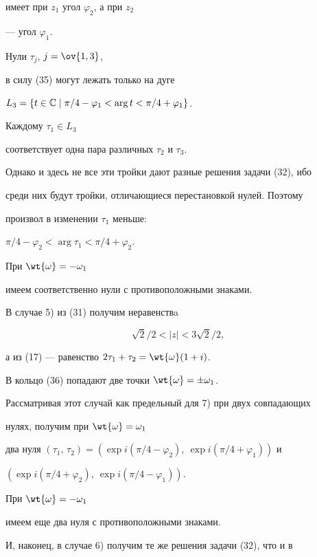 имеет при $z_1$ угол $\varphi _2$, а при $z_2$


--- угол $\varphi _1$.


Нули $\tau_{j}$, $j=\ov{1,3}$,


в силу (35) могут лежать только на дуге


$L_3=\{t\in\Bbb C\mid \pi /4-\varphi_1<\arg t<\pi/4+\varphi _1\}$.


Каждому $\tau_1 \in L_3 $


соответствует одна пара различных $\tau_2$ и $\tau_3$.


Однако и здесь не все эти тройки дают разные решения задачи (32), ибо


среди них будут тройки, отличающиеся перестановкой нулей. Поэтому


произвол в изменении $\tau_1$ меньше:


$\pi /4 -\varphi _2 <\arg \tau_1 <\pi /4 +\varphi _2$.


При $\wt{\omega}=-\omega_1$


имеем соответственно нули с противоположными знаками.





В случае 5) из (31) получим неравенствa


\begin{equation}


\sqrt{2}/2<|z| < 3\sqrt{2}/2,


\end{equation}


а из (17) --- равенство $2\tau_1 +\tau_2 = \wt{\omega} (1+i)$.


В кольцо (36) попадают две точки $\wt{\omega}=\pm \omega_1$.


Рассматривая этот случай как предельный для 7) при двух совпадающих


нулях, получим при $\wt{\omega}=\omega_1$


два нуля $(\tau_1,\,\tau_2)=


(\exp i(\pi/4-\varphi_2),\ 


\exp i(\pi/4+\varphi_1))$ и


$(\exp i(\pi/4+\varphi_2),\


\exp i(\pi/4-\varphi_1))$.


При $\wt{\omega}=- \omega_1$


имеем еще два нуля с противоположными знаками.


И, наконец, в случае 6) получим те же решения задачи (32), что и в


